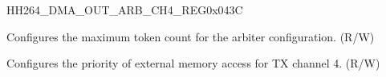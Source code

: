 \begin{register}{H}{H264\_DMA\_OUT\_ARB\_CH4\_REG}{0x043C}\label{regdesc:H264DMAOUTARBCH4REG}
%
%
%
\regnewline%
\begin{regdesc}\begin{reglist}
\label{fielddesc:H264DMAOUTARBTOKENNUMCH4}\item [H264\_DMA\_OUT\_ARB\_TOKEN\_NUM\_CH4] Configures the maximum token count for the arbiter configuration. (R/W)
\label{fielddesc:H264DMAEXTEROUTARBPRIORITYCH4}\item [H264\_DMA\_EXTER\_OUT\_ARB\_PRIORITY\_CH4] Configures the priority of external memory access for TX channel 4. (R/W)
\end{reglist}\end{regdesc}
\end{register}


